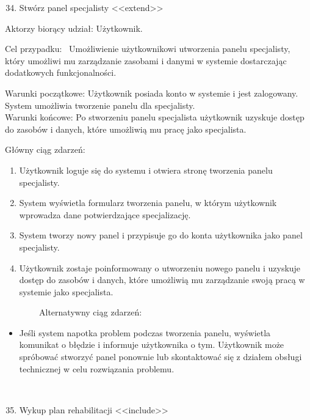 \documentclass[
]{article}
\providecommand{\tightlist}{%
  \setlength{\itemsep}{0pt}\setlength{\parskip}{0pt}}
\begin{document}
\begin{enumerate}
\setcounter{enumi}{33}
\tightlist
\item
  {Stwórz panel specjalisty
  \textless\textless extend\textgreater\textgreater{}}
\end{enumerate}

{Aktorzy biorący udział: Użytkownik.}

{Cel przypadku: ~Umożliwienie użytkownikowi utworzenia panelu
specjalisty, który umożliwi mu zarządzanie zasobami i danymi w systemie
dostarczając dodatkowych funkcjonalności.}

{Warunki początkowe: Użytkownik posiada konto w systemie i jest
zalogowany. System umożliwia tworzenie panelu dla specjalisty.\\
Warunki końcowe: Po stworzeniu panelu specjalista użytkownik uzyskuje
dostęp do zasobów i danych, które umożliwią mu pracę jako specjalista.}

{Główny ciąg zdarzeń:}

\begin{enumerate}
\tightlist
\item
  {Użytkownik loguje się do systemu i otwiera stronę tworzenia panelu
  specjalisty.}
\item
  {System wyświetla formularz tworzenia panelu, w którym użytkownik
  wprowadza dane potwierdzające specjalizację.}
\item
  {System tworzy nowy panel i przypisuje go do konta użytkownika jako
  panel specjalisty.}
\item
  {Użytkownik zostaje poinformowany o utworzeniu nowego panelu i
  uzyskuje dostęp do zasobów i danych, które umożliwią mu zarządzanie
  swoją pracą w systemie jako specjalista.}
\end{enumerate}

{~~~~~~~~Alternatywny ciąg zdarzeń:}

\begin{itemize}
\tightlist
\item
  {Jeśli system napotka problem podczas tworzenia panelu, wyświetla
  komunikat o błędzie i informuje użytkownika o tym. Użytkownik może
  spróbować stworzyć panel ponownie lub skontaktować się z działem
  obsługi technicznej w celu rozwiązania problemu.\\
  \strut \\
  }
\end{itemize}

\begin{enumerate}
\setcounter{enumi}{34}
\tightlist
\item
  {Wykup plan rehabilitacji
  \textless\textless include\textgreater\textgreater{}}
\end{enumerate}
\end{document}
